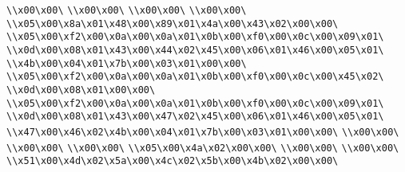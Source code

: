 \verb|\\x00\x00\|\newline
\verb|\\x00\x00\|\newline
\verb|\\x00\x00\|\newline
\verb|\\x00\x00\|\newline
\verb|\\x05\x00\x8a\x01\x48\x00\x89\x01\x4a\x00\x43\x02\x00\x00\|\newline
\verb|\\x05\x00\xf2\x00\x0a\x00\x0a\x01\x0b\x00\xf0\x00\x0c\x00\x09\x01\|\newline
\verb|\\x0d\x00\x08\x01\x43\x00\x44\x02\x45\x00\x06\x01\x46\x00\x05\x01\|\newline
\verb|\\x4b\x00\x04\x01\x7b\x00\x03\x01\x00\x00\|\newline
\verb|\\x05\x00\xf2\x00\x0a\x00\x0a\x01\x0b\x00\xf0\x00\x0c\x00\x45\x02\|\newline
\verb|\\x0d\x00\x08\x01\x00\x00\|\newline
\verb|\\x05\x00\xf2\x00\x0a\x00\x0a\x01\x0b\x00\xf0\x00\x0c\x00\x09\x01\|\newline
\verb|\\x0d\x00\x08\x01\x43\x00\x47\x02\x45\x00\x06\x01\x46\x00\x05\x01\|\newline
\verb|\\x47\x00\x46\x02\x4b\x00\x04\x01\x7b\x00\x03\x01\x00\x00\|\newline
\verb|\\x00\x00\|\newline
\verb|\\x00\x00\|\newline
\verb|\\x00\x00\|\newline
\verb|\\x05\x00\x4a\x02\x00\x00\|\newline
\verb|\\x00\x00\|\newline
\verb|\\x00\x00\|\newline
\verb|\\x51\x00\x4d\x02\x5a\x00\x4c\x02\x5b\x00\x4b\x02\x00\x00\|\newline
